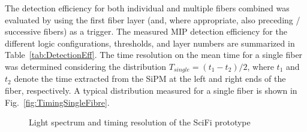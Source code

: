 \begin{refsection}
        \noindent
        The detection efficiency for both individual and multiple fibers combined was evaluated by using the first fiber layer (and, where appropriate, also preceding / successive fibers) as a trigger. The measured MIP detection efficiency for the different logic configurations, thresholds, and layer numbers are summarized in Table~\ref{tab:DetectionEff}.
        The time resolution on the mean time for a single fiber was determined considering the distribution $T_{single} = (t_{1}-t_{2})/2$, where $t_{1}$ and $t_{2}$ denote the time extracted from the SiPM at the left and right ends of the fiber, respectively. A typical distribution measured for a single fiber is shown in Fig.~\ref{fig:TimingSingleFibre}.

        \begin{figure}
            \centering
            \hfill
            \caption[SciFi prototype: light spectrum and time resolution]{Light spectrum and timing resolution of the SciFi prototype}
            \label{fig:enter-label}
        \end{figure}
        

\end{refsection}
